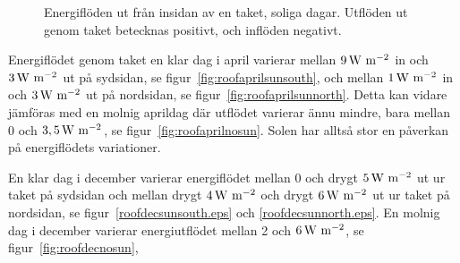 \begin{figure}[hpbt]
\centering
{}

\caption{\label{fig:rooffigurescloud}Energiflöden ut från insidan av en taket, soliga dagar. Utflöden ut genom taket betecknas positivt, och inflöden negativt.}
\end{figure}

Energiflödet genom taket 
en klar dag i april varierar mellan $\unit[9]{W~m^{-2}}$ in och $\unit[3]{W~m^{-2}}$ ut på sydsidan, se figur~\ref{fig:roofaprilsunsouth}, 
och 
mellan $\unit[1]{W~m^{-2}}$ in och $\unit[3]{W~m^{-2}}$ ut på nordsidan, se figur~\ref{fig:roofaprilsunnorth}. 
Detta kan vidare jämföras med en molnig aprildag där utflödet varierar ännu mindre, bara mellan 0 och $\unit[3,5]{W~m^{-2}}$, se figur~\ref{fig:roofaprilnosun}. Solen har alltså stor en påverkan på energiflödets variationer.

En klar dag i december varierar energiflödet mellan 0 och drygt $\unit[5]{W~m^{-2}}$ ut ur taket på sydsidan och mellan drygt $\unit[4]{W~m^{-2}}$ och drygt $\unit[6]{W~m^{-2}}$ ut ur taket på nordsidan, se figur~\ref{roofdecsunsouth.eps} och \ref{roofdecsunnorth.eps}. En molnig dag i december varierar energiutflödet mellan 2 och $\unit[6]{W~m^{-2}}$, se figur~\ref{fig:roofdecnosun},


